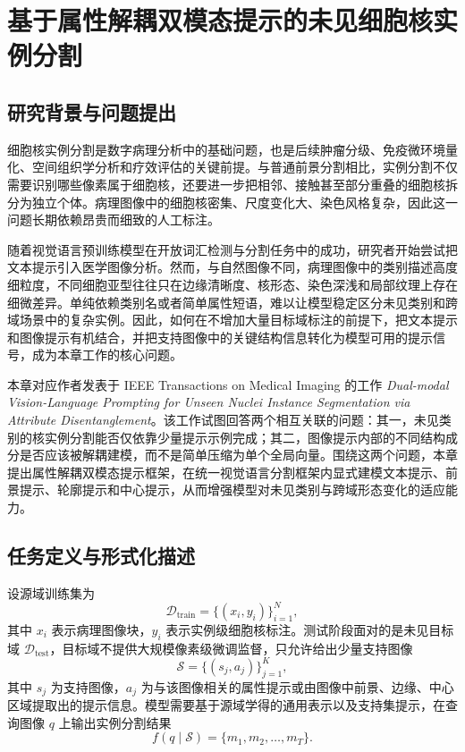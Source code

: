 \chapter{基于属性解耦双模态提示的未见细胞核实例分割}

\section{研究背景与问题提出}
细胞核实例分割是数字病理分析中的基础问题，也是后续肿瘤分级、免疫微环境量化、空间组织学分析和疗效评估的关键前提。与普通前景分割相比，实例分割不仅需要识别哪些像素属于细胞核，还要进一步把相邻、接触甚至部分重叠的细胞核拆分为独立个体。病理图像中的细胞核密集、尺度变化大、染色风格复杂，因此这一问题长期依赖昂贵而细致的人工标注。

随着视觉语言预训练模型在开放词汇检测与分割任务中的成功，研究者开始尝试把文本提示引入医学图像分析。然而，与自然图像不同，病理图像中的类别描述高度细粒度，不同细胞亚型往往只在边缘清晰度、核形态、染色深浅和局部纹理上存在细微差异。单纯依赖类别名或者简单属性短语，难以让模型稳定区分未见类别和跨域场景中的复杂实例。因此，如何在不增加大量目标域标注的前提下，把文本提示和图像提示有机结合，并把支持图像中的关键结构信息转化为模型可用的提示信号，成为本章工作的核心问题。

本章对应作者发表于 IEEE Transactions on Medical Imaging 的工作 \emph{Dual-modal Vision-Language Prompting for Unseen Nuclei Instance Segmentation via Attribute Disentanglement}。该工作试图回答两个相互关联的问题：其一，未见类别的核实例分割能否仅依靠少量提示示例完成；其二，图像提示内部的不同结构成分是否应该被解耦建模，而不是简单压缩为单个全局向量。围绕这两个问题，本章提出属性解耦双模态提示框架，在统一视觉语言分割框架内显式建模文本提示、前景提示、轮廓提示和中心提示，从而增强模型对未见类别与跨域形态变化的适应能力。

\section{任务定义与形式化描述}
设源域训练集为
\[
\mathcal{D}_{\text{train}}=\{(x_i, y_i)\}_{i=1}^{N},
\]
其中 $x_i$ 表示病理图像块，$y_i$ 表示实例级细胞核标注。测试阶段面对的是未见目标域 $\mathcal{D}_{\text{test}}$，目标域不提供大规模像素级微调监督，只允许给出少量支持图像
\[\mathcal{S}=\{(s_j, a_j)\}_{j=1}^{K},
\]
其中 $s_j$ 为支持图像，$a_j$ 为与该图像相关的属性提示或由图像中前景、边缘、中心区域提取出的提示信息。模型需要基于源域学得的通用表示以及支持集提示，在查询图像 $q$ 上输出实例分割结果
\[
f(q \mid \mathcal{S}) = \{m_1,m_2,\dots,m_T\}.
\]


